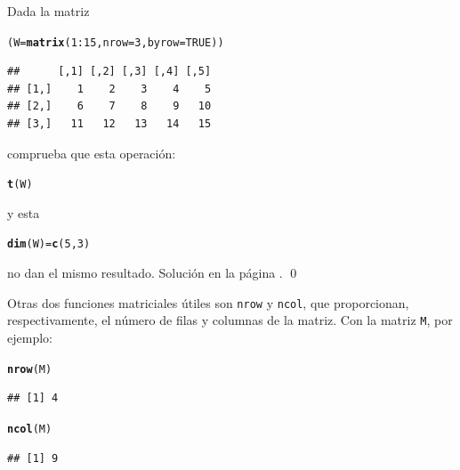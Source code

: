 \documentclass[10pt,a4paper]{article}\usepackage[]{graphicx}\usepackage[]{color}
\makeatletter
\newcommand{\hlnum}[1]{\textcolor[rgb]{0.686,0.059,0.569}{#1}}%
\newcommand{\hlopt}[1]{\textcolor[rgb]{0,0,0}{#1}}%
\newcommand{\hlstd}[1]{\textcolor[rgb]{0.345,0.345,0.345}{#1}}%
\newcommand{\hlkwb}[1]{\textcolor[rgb]{0.69,0.353,0.396}{#1}}%
\newcommand{\hlkwc}[1]{\textcolor[rgb]{0.333,0.667,0.333}{#1}}%
\newcommand{\hlkwd}[1]{\textcolor[rgb]{0.737,0.353,0.396}{\textbf{#1}}}%
\newenvironment{kframe}{%
 \def\at@end@of@kframe{}%
 \ifinner\ifhmode%
  \def\at@end@of@kframe{\end{minipage}}%
  \begin{minipage}{\columnwidth}%
 \fi\fi%
 \def\FrameCommand##1{\hskip\@totalleftmargin \hskip-\fboxsep
 \colorbox{shadecolor}{##1}\hskip-\fboxsep
     \hskip-\linewidth \hskip-\@totalleftmargin \hskip\columnwidth}%
 \MakeFramed {\advance\hsize-\width
   \@totalleftmargin\z@ \linewidth\hsize
   \@setminipage}}%
 {\par\unskip\endMakeFramed%
 \at@end@of@kframe}
\newenvironment{knitrout}{}{} %
\makeatother
\begin{document}
\begin{ejercicio}
\label{tut03:ejercicio07}
\quad
Dada la matriz
\begin{knitrout}
\color{fgcolor}\begin{kframe}
\begin{alltt}
     \hlstd{(W} \hlkwb{=} \hlkwd{matrix}\hlstd{(}\hlnum{1}\hlopt{:}\hlnum{15}\hlstd{,} \hlkwc{nrow}\hlstd{=}\hlnum{3}\hlstd{,} \hlkwc{byrow}\hlstd{=}\hlnum{TRUE}\hlstd{))}
\end{alltt}
\begin{verbatim}
##      [,1] [,2] [,3] [,4] [,5]
## [1,]    1    2    3    4    5
## [2,]    6    7    8    9   10
## [3,]   11   12   13   14   15
\end{verbatim}
\end{kframe}
\end{knitrout}
     comprueba que esta operación:
\begin{knitrout}
\color{fgcolor}\begin{kframe}
\begin{alltt}
\hlkwd{t}\hlstd{(W)}
\end{alltt}
\end{kframe}
\end{knitrout}
     y esta
\begin{knitrout}
\color{fgcolor}\begin{kframe}
\begin{alltt}
     \hlkwd{dim}\hlstd{(W)} \hlkwb{=} \hlkwd{c}\hlstd{(}\hlnum{5}\hlstd{,}\hlnum{3}\hlstd{)}
\end{alltt}
\end{kframe}
\end{knitrout}
     no dan el mismo resultado. Solución en la página \pageref{tut03:ejercicio07:sol}.
\qed
\end{ejercicio}
Otras dos funciones matriciales útiles son {\tt nrow} y {\tt ncol}, que proporcionan, respectivamente, el número de filas y columnas de la matriz. Con la matriz {\tt M}, por ejemplo:
\begin{knitrout}
\color{fgcolor}\begin{kframe}
\begin{alltt}
\hlkwd{nrow}\hlstd{(M)}
\end{alltt}
\begin{verbatim}
## [1] 4
\end{verbatim}
\begin{alltt}
\hlkwd{ncol}\hlstd{(M)}
\end{alltt}
\begin{verbatim}
## [1] 9
\end{verbatim}
\end{kframe}
\end{knitrout}
\end{document}
